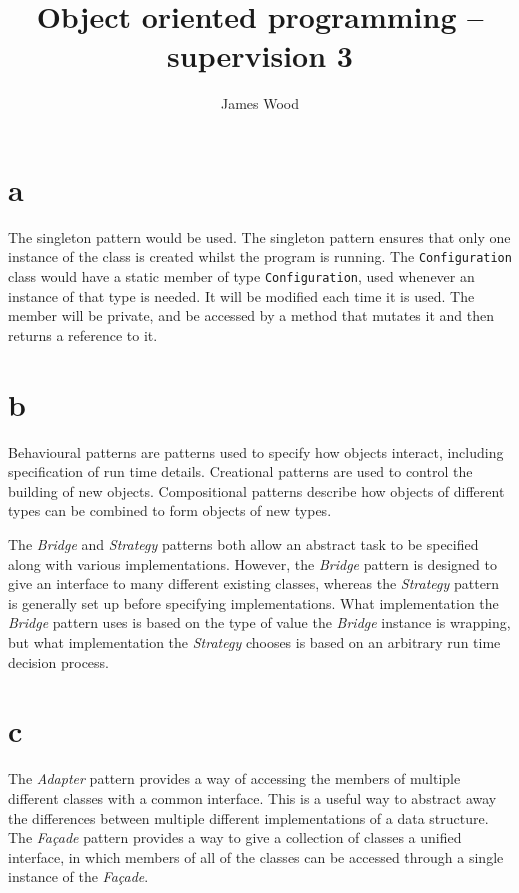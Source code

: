 \documentclass[11pt]{article}
\title{\textbf{Object oriented programming -- supervision 3}}
\author{James Wood}
\begin{document}
\maketitle

\section*{a}
The singleton pattern would be used. The singleton pattern ensures that only one instance of the class is created whilst the program is running. The \texttt{Configuration} class would have a static member of type \texttt{Configuration}, used whenever an instance of that type is needed. It will be modified each time it is used. The member will be private, and be accessed by a method that mutates it and then returns a reference to it.

\section*{b}
Behavioural patterns are patterns used to specify how objects interact, including specification of run time details. Creational patterns are used to control the building of new objects. Compositional patterns describe how objects of different types can be combined to form objects of new types.

The \textit{Bridge} and \textit{Strategy} patterns both allow an abstract task to be specified along with various implementations. However, the \textit{Bridge} pattern is designed to give an interface to many different existing classes, whereas the \textit{Strategy} pattern is generally set up before specifying implementations. What implementation the \textit{Bridge} pattern uses is based on the type of value the \textit{Bridge} instance is wrapping, but what implementation the \textit{Strategy} chooses is based on an arbitrary run time decision process.

\section*{c}
The \textit{Adapter} pattern provides a way of accessing the members of multiple different classes with a common interface. This is a useful way to abstract away the differences between multiple different implementations of a data structure. The \textit{Façade} pattern provides a way to give a collection of classes a unified interface, in which members of all of the classes can be accessed through a single instance of the \textit{Façade}.
\end{document}
